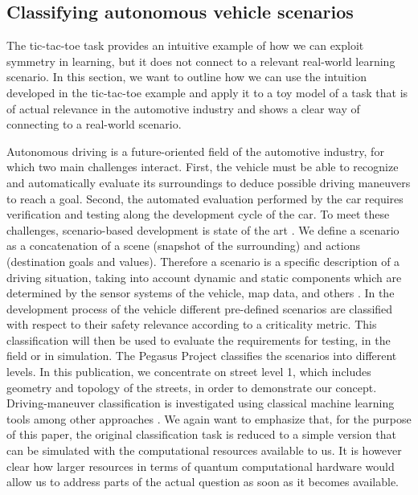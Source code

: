 \documentclass[a4paper,twocolumn,notitlepage,nofootinbib,superscriptaddress,floatfix]{revtex4-2}
\begin{document}
\subsection*{Classifying autonomous vehicle scenarios}
The tic-tac-toe task provides an intuitive example of how we can exploit symmetry in learning, but it does not connect to a relevant real-world learning scenario. In this section, we want to outline how we can use the intuition developed in the tic-tac-toe example and apply it to a toy model of a task that is of actual relevance in the automotive industry and shows a clear way of connecting to a real-world scenario.

Autonomous driving is a future-oriented field of the automotive industry, for which two main challenges interact. First, the vehicle must be able to recognize and automatically evaluate its surroundings to deduce possible driving maneuvers to reach a goal. Second, the automated evaluation performed by the car requires verification and testing along the development cycle of the car. To meet these challenges, scenario-based development is state of the art \cite{2018arXiv180108598M}. We define a scenario as a concatenation of a scene (snapshot of the surrounding) and actions (destination goals and values). Therefore a scenario is a specific description of a driving situation, taking into account dynamic and static components which are determined by the sensor systems of the vehicle, map data, and others \cite{unifiedontology}. In the development process of the vehicle different pre-defined scenarios are classified with respect to their safety relevance according to a criticality metric. This classification will then be used to evaluate the requirements for testing, in the field or in simulation. 
The Pegasus Project \cite{2021arXiv210409097S} classifies the scenarios into different levels. In this publication, we concentrate on street level 1, which includes geometry and topology of the streets, in order to demonstrate our concept. Driving-maneuver classification is investigated using classical machine learning tools among other approaches \cite{7995704,8166755}. We again want to emphasize that, for the purpose of this paper, the original classification task is reduced to a simple version that can be simulated with the computational resources available to us. It is however clear how larger resources in terms of quantum computational hardware would allow us to address parts of the actual question as soon as it becomes available.
\end{document}
